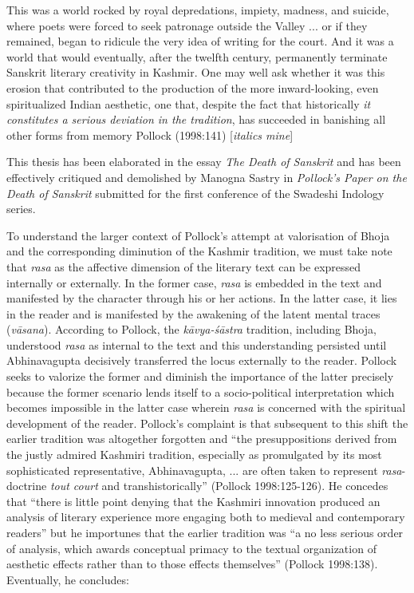 \begin{myquote}
This was a world rocked by royal depredations, impiety, madness, and suicide, where poets were forced to seek patronage outside the Valley ... or if they remained, began to ridicule the very idea of writing for the court. And it was a world that would eventually, after the twelfth century, permanently terminate Sanskrit literary creativity in Kashmir. One may well ask whether it was this erosion that contributed to the production of the more inward-looking, even spiritualized Indian aesthetic, one that, despite the fact that historically \textsl{it constitutes a serious deviation in the tradition}, has succeeded in banishing all other forms from memory
\hfill Pollock (1998:141) [\textsl{italics mine}]
\end{myquote}

This thesis has been elaborated in the essay \textsl{The Death of Sanskrit} and has been effectively critiqued and demolished by Manogna Sastry in \textsl{Pollock's Paper on the Death of Sanskrit} submitted for the first conference of the Swadeshi Indology series.
\eject

To understand the larger context of Pollock's attempt at valorisation of Bhoja and the corresponding diminution of the Kashmir tradition, we must take note that \textsl{rasa} as the affective dimension of the literary text can be expressed internally or externally. In the former case, \textsl{rasa} is embedded in the text and manifested by the character through his or her actions. In the latter case, it lies in the reader and is manifested by the awakening of the latent mental traces (\textsl{vāsana}). According to Pollock, the \textsl{kāvya-śāstra} tradition, including Bhoja, understood \textsl{rasa} as internal to the text and this understanding persisted until Abhinavagupta decisively transferred the locus externally to the reader. Pollock seeks to valorize the former and diminish the importance of the latter precisely because the former scenario lends itself to a socio-political interpretation which becomes impossible in the latter case wherein \textsl{rasa} is concerned with the spiritual development of the reader. Pollock's complaint is that subsequent to this shift the earlier tradition was altogether forgotten and ``the presuppositions derived from the justly admired Kashmiri tradition, especially as promulgated by its most sophisticated representative, Abhinavagupta, ... are often taken to represent \textsl{rasa}-doctrine \textsl{tout court} and transhistorically'' (Pollock 1998:125-126). He concedes that ``there is little point denying that the Kashmiri innovation produced an analysis of literary experience more engaging both to medieval and contemporary readers'' but he importunes that the earlier tradition was ``a no less serious order of analysis, which awards conceptual primacy to the textual organization of aesthetic effects rather than to those effects themselves'' (Pollock 1998:138). Eventually, he concludes:

